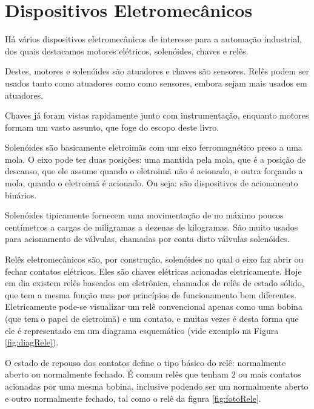\section{Dispositivos Eletromecânicos}

Há vários dispositivos eletromecânicos de interesse para a automação industrial, dos quais destacamos motores elétricos, solenóides, chaves e relês.

Destes, motores e solenóides são atuadores e chaves são sensores. Relês podem ser usados tanto como atuadores como como sensores, embora sejam mais usados em atuadores.

Chaves já foram vistas rapidamente junto com instrumentação, enquanto motores formam um vasto assunto, que foge do escopo deste livro.

Solenóides são basicamente eletroimãs com um eixo ferromagnético preso a uma mola. O eixo pode ter duas posições: uma mantida pela mola, que é a posição de descanso, que ele assume quando o eletroimã não é acionado, e outra forçando a mola, quando o eletroimã é acionado. Ou seja: são dispositivos de acionamento binários.

Solenóides tipicamente fornecem uma movimentação de no máximo poucos centímetros a cargas de miligramas a dezenas de kilogramas. São muito usados para acionamento de válvulas, chamadas por conta disto válvulas solenóides.

Relês eletromecânicos são, por construção, solenóides no qual o eixo faz abrir ou fechar contatos elétricos. Eles são chaves elétricas acionadas eletricamente. Hoje em dia existem relês baseados em eletrônica, chamados de relês de estado sólido, que tem a mesma função mas por princípios de funcionamento bem diferentes. Eletricamente pode-se visualizar um relê convencional apenas como uma bobina (que tem o papel de eletroimã) e um contato, e muitas vezes é desta forma que ele é representado em um diagrama esquemático (vide exemplo na Figura \ref{fig:diagRele}).

O estado de repouso dos contatos define o tipo básico do relê: normalmente aberto ou normalmente fechado. É comum relês que tenham 2 ou mais contatos acionadas por uma mesma bobina, inclusive podendo ser um normalmente aberto e outro normalmente fechado, tal como o relê da figura \ref{fig:fotoRele}.

